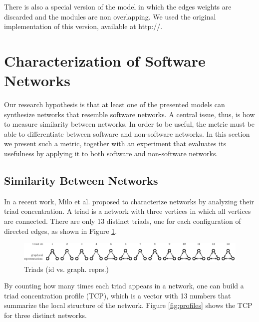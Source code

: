 There is also a special version of the model in which the edges weights are
discarded and the modules are non overlapping. We used the original
implementation of this version, available at http://. 


\section{Characterization of Software Networks}

Our research hypothesis is that at least one of the presented models can
synthesize networks that resemble software networks. A central issue, thus, is
how to measure similarity between networks. In order to be useful, the metric
must be able to differentiate between software and non-software networks. In
this section we present such a metric, together with an experiment that
evaluates its usefulness by applying it to both software and non-software
networks. %

\subsection{Similarity Between Networks}

In a recent work, Milo et al. \cite{Milo2002} proposed to characterize networks
by analyzing their triad concentration. A triad is a network with three vertices
in which all vertices are connected. There are only 13 distinct triads, one for
each configuration of directed edges, as shown in Figure \ref{fig:triads}.

\begin{figure}[!t]
\centering
\includegraphics[width=1.0\textwidth]{triads}
\caption{Triads (id vs. graph. reprs.)}
\label{fig:triads}
\end{figure}

By counting how many times each triad appears in a network, one can build a
triad concentration profile (TCP), which is a vector with 13 numbers that
summarize the local structure of the network. Figure \ref{fig:profiles} shows
the TCP for three distinct networks.

